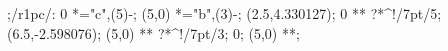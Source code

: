 %

;/r1pc/:                       %
		0 *\dir{*}="c",{\ellipse(5){-}};                %
		(5,0) *\dir{*}="b",{\ellipse(3){-}};                %
		(2.5,4.330127); 0 **\dir{-}   ?*^!/7pt/{5};     %
		(6.5,-2.598076); (5,0) **\dir{-} ?*^!/7pt/{3};     %
		0; (5,0) **\dir{-};     %
\endxy


